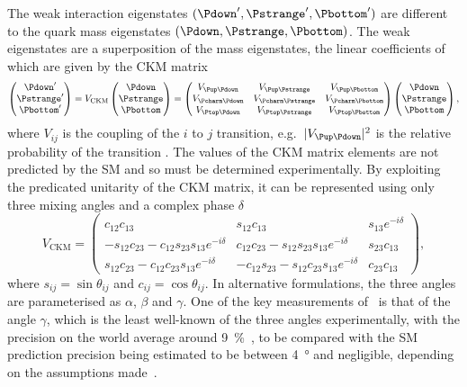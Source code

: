 The weak interaction eigenstates $(\Pdown', \Pstrange', \Pbottom')$ 
are different to the quark mass eigenstates $(\Pdown, \Pstrange, \Pbottom)$.
The weak eigenstates are a superposition of the mass eigenstates, the linear 
coefficients of which are given by the \ac{CKM} matrix
\begin{equation}
  \begin{pmatrix} \Pdown' \\ \Pstrange' \\ \Pbottom' \end{pmatrix}
  =
  V_{\text{CKM}}\begin{pmatrix} \Pdown \\ \Pstrange \\ \Pbottom \end{pmatrix}
  =
  \begin{pmatrix}
    \Vud & \Vus & \Vub \\
    \Vcd & \Vcs & \Vcb \\
    \Vtd & \Vts & \Vtb
  \end{pmatrix}
  \begin{pmatrix} \Pdown \\ \Pstrange \\ \Pbottom \end{pmatrix},
\end{equation}
where $V_{ij}$ is the coupling of the $i$ to $j$ transition, e.g.\ $|\Vud|^{2}$ is 
the relative probability of the transition \decay{\Pdown}{\Pup}.
The values of the \ac{CKM} matrix elements are not predicted by the \ac{SM} and 
so must be determined experimentally.
By exploiting the predicated unitarity of the \ac{CKM} matrix, it can be 
represented using only three mixing angles and a complex phase $\delta$
\begin{equation}
  V_{\textrm{CKM}} =
  \begin{pmatrix}
    c_{12}c_{13} & s_{12}c_{13} & s_{13}e^{-i\delta} \\
    -s_{12}c_{23} - c_{12}s_{23}s_{13}e^{-i\delta} & c_{12}c_{23} - s_{12}s_{23}s_{13}e^{-i\delta} & s_{23}c_{13} \\
    s_{12}c_{23} - c_{12}c_{23}s_{13}e^{-i\delta} & -c_{12}s_{23} - s_{12}c_{23}s_{13}e^{-i\delta} & c_{23}c_{13}
  \end{pmatrix},
\end{equation}
where $s_{ij} = \sin{\theta_{ij}}$ and $c_{ij} = \cos{\theta_{ij}}$.
In alternative formulations, the three angles are parameterised as $\alpha$, $\beta$ and $\gamma$.
One of the key measurements of \lhcb\ is that of the angle $\gamma$, which is 
the least well-known of the three angles experimentally, with the precision on 
the world average around \SI{9}{\percent}~\cite{LHCb-CONF-2016-001}, to be 
compared with the \ac{SM} prediction precision being estimated to be between 
\SI{4}{\degree} and negligible, depending on the assumptions 
made~\cite{Brod:2013sga,Brod:2014bfa}.

